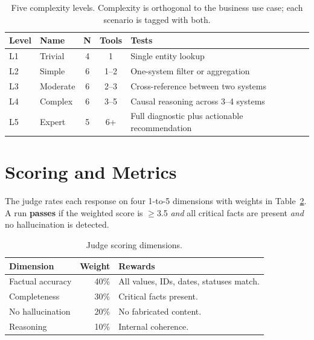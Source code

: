 \begin{table}[H]
    \centering\small
    \begin{tabularx}{\textwidth}{|l|l|c|c|X|}
        \hline
        \rowcolor{lightgray}
        \textbf{Level} & \textbf{Name} & \textbf{N} & \textbf{Tools} & \textbf{Tests} \\
        \hline
        L1 & Trivial   & 4  & 1    & Single entity lookup \\ \hline
        L2 & Simple    & 6  & 1--2 & One-system filter or aggregation \\ \hline
        L3 & Moderate  & 6  & 2--3 & Cross-reference between two systems \\ \hline
        L4 & Complex   & 6  & 3--5 & Causal reasoning across 3--4 systems \\ \hline
        L5 & Expert    & 5  & 6+   & Full diagnostic plus actionable recommendation \\ \hline
    \end{tabularx}
    \caption{Five complexity levels. Complexity is orthogonal to the business use case; each scenario is tagged with both.}
    \label{tab:levels}
\end{table}

\section{Scoring and Metrics}

The judge rates each response on four 1-to-5 dimensions with weights in Table~\ref{tab:dimensions}. A run \textbf{passes} if the weighted score is $\geq$3.5 \emph{and} all critical facts are present \emph{and} no hallucination is detected.

\begin{table}[H]
    \centering\small
    \begin{tabularx}{\textwidth}{|l|r|X|}
        \hline
        \rowcolor{lightgray}
        \textbf{Dimension} & \textbf{Weight} & \textbf{Rewards} \\
        \hline
        Factual accuracy  & 40\% & All values, IDs, dates, statuses match. \\ \hline
        Completeness      & 30\% & Critical facts present. \\ \hline
        No hallucination  & 20\% & No fabricated content. \\ \hline
        Reasoning         & 10\% & Internal coherence. \\ \hline
    \end{tabularx}
    \caption{Judge scoring dimensions.}
    \label{tab:dimensions}
\end{table}

